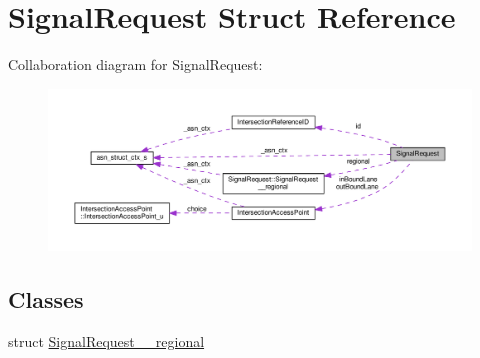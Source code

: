 \hypertarget{structSignalRequest}{}\section{Signal\+Request Struct Reference}
\label{structSignalRequest}


Collaboration diagram for Signal\+Request\+:\nopagebreak
\begin{figure}[H]
\begin{center}
\leavevmode
\includegraphics[width=350pt]{structSignalRequest__coll__graph}
\end{center}
\end{figure}
\subsection*{Classes}
\begin{DoxyCompactItemize}
\item 
struct \hyperlink{structSignalRequest_1_1SignalRequest____regional}{Signal\+Request\+\_\+\+\_\+regional}
\end{DoxyCompactItemize}
